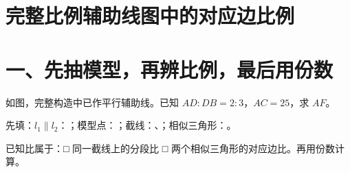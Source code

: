 \documentclass{exam-zh}
\newcounter{solstep}
\begin{document}
\section*{完整比例辅助线图中的对应边比例}

\section*{一、先抽模型，再辨比例，最后用份数}


\begin{problem}[points=10]
  \noindent
  \begin{minipage}[t]{\dimexpr\linewidth-60mm-6mm\relax}
    \vspace{0pt}
    如图，完整构造中已作平行辅助线。已知 $AD:DB=2:3$，$AC=25$，求 $AF$。

先填：$l_1\parallel l_2$：\underline{\hspace{1.5cm}}；模型点：\underline{\hspace{0.8cm}}；截线：\underline{\hspace{1.3cm}}、\underline{\hspace{1.3cm}}；相似三角形：\underline{\hspace{3cm}}。

已知比属于：□ 同一截线上的分段比 \quad □ 两个相似三角形的对应边比。再用份数计算。


  \end{minipage}\hfill
  \begin{diagramcoltikz}{60mm}{第 1 题图}
  }
  \end{diagramcoltikz}
  \par\medskip
  \answerarea[34mm]
  \setcounter{solstep}{0}
  \begin{solutionblock}
  \end{solutionblock}
\end{problem}


\end{document}
